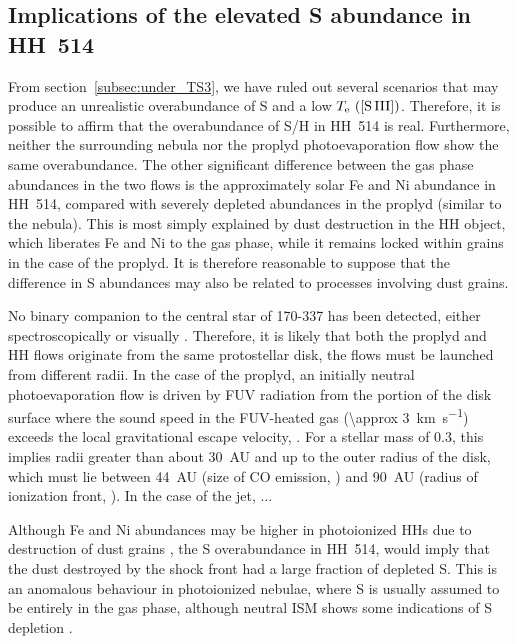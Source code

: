 \documentclass[fleqn,usenatbib]{mnras}
\begin{document}
\subsection{Implications of the elevated S abundance in HH~514}
\label{sec:why-do-two}
\label{subsec:real_overabundance}

From section~\ref{subsec:under_TS3}, we have ruled out several scenarios that may produce an unrealistic overabundance of S and a low $T_{\rm e} \text{ ([S\thinspace III])}$. Therefore, it is possible to affirm that the overabundance of S/H in HH~514 is real.
Furthermore, neither the surrounding nebula nor the proplyd photoevaporation flow
show the same overabundance.
The other significant difference between the gas phase abundances in the
two flows is the approximately solar Fe and Ni abundance in HH~514,
compared with severely depleted abundances in the proplyd (similar to the nebula).
This is most simply explained by dust destruction in the HH object,
which liberates Fe and Ni to the gas phase, while it remains locked within grains in the case of the proplyd.
It is therefore reasonable to suppose that the difference in S abundances
may also be related to processes involving dust grains.

No binary companion to the central star of 170-337 has been detected,
either spectroscopically \citep{Tobin:2009a}
or visually \citep{Duchene:2018a}.
Therefore, it is likely that
both the proplyd and HH flows originate from the same protostellar disk,
the flows must be launched from different radii.
In the case of the proplyd, an initially neutral photoevaporation flow
is driven by FUV radiation from the portion of the disk surface where
the sound speed in the FUV-heated gas (\SI{\approx 3}{km.s^{-1}})
exceeds the local gravitational escape velocity,
\citep{Johnstone:1998a}.
For a stellar mass of \SI{0.3}{\msun},
this implies radii greater than about \SI{30}{AU}
and up to the outer radius of the disk,
which must lie between \SI{44}{AU}
(size of CO emission, \citealp{Boyden:2020a})
and \SI{90}{AU}
(radius of ionization front, \citealp{Henney:1998b}).
In the case of the jet, ...


Although Fe and Ni abundances may be higher in photoionized HHs  due to destruction of dust grains \citep[][]{Blagrave06, mesadelgado09, mendez2021, mendez2021-2}, the S overabundance in HH~514, would imply that the dust destroyed by the shock front had a large fraction of depleted S. This is an anomalous behaviour in photoionized nebulae, where S is usually assumed to be entirely in the gas phase, although neutral ISM shows some indications of S depletion \citep[][]{Jenkins09}.
\end{document}
